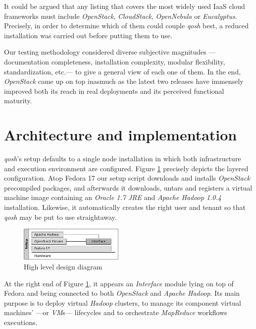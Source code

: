 \documentclass{sig-alternate}
\begin{document}
It could be argued that any listing that covers the most widely used IaaS cloud frameworks must include \emph{OpenStack}, \emph{CloudStack}, \emph{OpenNebula} or \emph{Eucalyptus}. Precisely, in order to determine which of them could couple \emph{qosh} best, a reduced installation was carried out before putting them to use.

Our testing methodology considered diverse subjective magnitudes ---documentation completeness, installation complexity, modular flexibility, standardization, etc.--- to give a general view of each one of them. In the end, \emph{OpenStack} came up on top inasmuch as the latest two releases have immensely improved both its reach in real deployments and its perceived functional maturity.



\section{Architecture and implementation}\label{sec:arch}
\noindent \emph{qosh}'s setup defaults to a single node installation in which both infrastructure and execution environment are configured. Figure \ref{fig:arch1} precisely depicts the layered configuration. Atop Fedora 17 our setup script downloads and installs \emph{OpenStack} precompiled packages, and afterwards it downloads, untars and registers a virtual machine image containing an \emph{Oracle 1.7 JRE} and \emph{Apache Hadoop 1.0.4} installation. Likewise, it automatically creates the right user and tenant so that \emph{qosh} may be put to use straightaway.

\begin{figure}[tbp]
\centering
\includegraphics[width=0.45\textwidth]{img/002}
\caption{High level design diagram}
\label{fig:arch1}
\end{figure}



At the right end of Figure \ref{fig:arch1}, it appears an \emph{Interface} module lying on top of Fedora and being connected to both \emph{OpenStack} and \emph{Apache Hadoop}. Its main purpose is to deploy virtual \emph{Hadoop} clusters, to manage its component virtual machines' ---or \emph{VM}s--- lifecycles and to orchestrate \emph{MapReduce} workflows executions.
\end{document}
